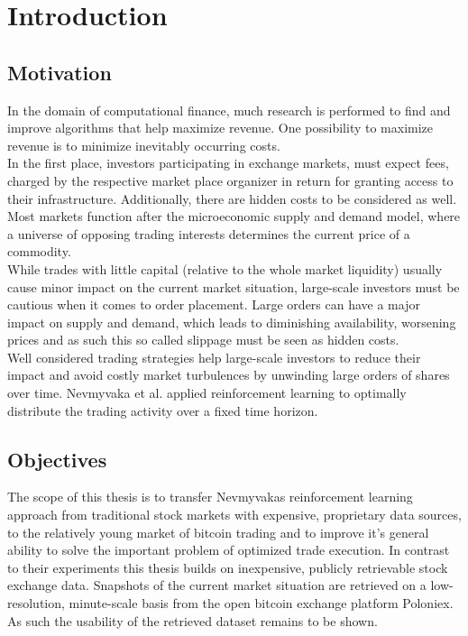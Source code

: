 \chapter{Introduction}
\label{chap:introduction}
\section{Motivation} 
\label{sec:motivation}
In the domain of computational finance, much research is performed to find and improve algorithms that help maximize revenue. One possibility to maximize revenue is to minimize inevitably occurring costs. \\

In the first place, investors participating in exchange markets, must expect fees, charged by the respective market place organizer in return for granting access to their infrastructure. Additionally, there are hidden costs to be considered as well. Most markets function after the microeconomic supply and demand \cite{todo} model, where a universe of opposing trading interests determines the current price of a commodity.\\

While trades with little capital (relative to the whole market liquidity) usually cause minor impact on the current market situation, large-scale investors must be cautious when it comes to order placement. Large orders can have a major impact on supply and demand, which leads to diminishing availability, worsening prices and as such this so called slippage must be seen as hidden costs. \\

Well considered trading strategies help large-scale investors to reduce their impact and avoid costly market turbulences by unwinding large orders of shares over time. 
Nevmyvaka et al. \cite{Nevmyvaka:2006} applied reinforcement learning to optimally distribute the trading activity over a fixed time horizon.\\

\section{Objectives}
\label{sec:objectives}
The scope of this thesis is to transfer Nevmyvakas \cite{Nevmyvaka:2006} reinforcement learning approach from traditional stock markets with expensive, proprietary data sources, to the relatively young market of bitcoin trading and to improve it's general ability to solve the important problem of optimized trade execution. In contrast to their experiments this thesis builds on inexpensive, publicly retrievable stock exchange data. Snapshots of the current market situation are retrieved on a low-resolution, minute-scale basis from the open bitcoin exchange platform Poloniex. As such the usability of the retrieved dataset remains to be shown. \\

